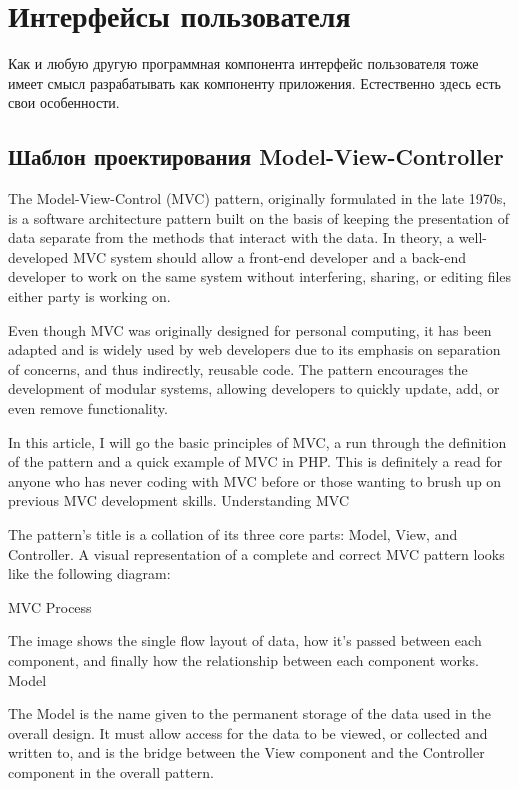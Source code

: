 \documentclass[a4paper,openany,twoside,draft]{book}
\begin{document}
\chapter{Интерфейсы пользователя}

Как и любую другую программная компонента интерфейс пользователя тоже имеет смысл разрабатывать как компоненту приложения.  Естественно здесь есть свои особенности.

\section{Шаблон проектирования Model-View-Controller}
\label{sec:MVC}

The Model-View-Control (MVC) pattern, originally formulated in the late 1970s, is a software architecture pattern built on the basis of keeping the presentation of data separate from the methods that interact with the data. In theory, a well-developed MVC system should allow a front-end developer and a back-end developer to work on the same system without interfering, sharing, or editing files either party is working on.

Even though MVC was originally designed for personal computing, it has been adapted and is widely used by web developers due to its emphasis on separation of concerns, and thus indirectly, reusable code. The pattern encourages the development of modular systems, allowing developers to quickly update, add, or even remove functionality.

In this article, I will go the basic principles of MVC, a run through the definition of the pattern and a quick example of MVC in PHP. This is definitely a read for anyone who has never coding with MVC before or those wanting to brush up on previous MVC development skills.
Understanding MVC

The pattern’s title is a collation of its three core parts: Model, View, and Controller. A visual representation of a complete and correct MVC pattern looks like the following diagram:

MVC Process

The image shows the single flow layout of data, how it’s passed between each component, and finally how the relationship between each component works.
Model

The Model is the name given to the permanent storage of the data used in the overall design. It must allow access for the data to be viewed, or collected and written to, and is the bridge between the View component and the Controller component in the overall pattern.
\end{document}
